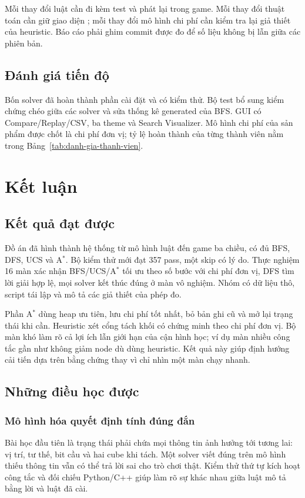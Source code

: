 \documentclass[a4paper]{article}
\newcommand{\tep}[1]{{\small\ttfamily\detokenize{#1}}}
\newcommand{\astar}{\texorpdfstring{A\ensuremath{^*}}{A*}}
\begin{document}
Mỗi thay đổi luật cần đi kèm test và phát lại trong game. Mỗi thay đổi thuật toán cần giữ giao diện \tep{SearchResult}; mỗi thay đổi mô hình chi phí cần kiểm tra lại giả thiết của heuristic. Báo cáo phải ghim commit được đo để số liệu không bị lẫn giữa các phiên bản.




\subsection{Đánh giá tiến độ}
Bốn solver đã hoàn thành phần cài đặt và có kiểm thử. Bộ test bổ sung kiểm chứng chéo giữa các solver và sửa thống kê generated của BFS. GUI có Compare/Replay/CSV, ba theme và Search Visualizer. Mô hình chi phí của sản phẩm được chốt là chi phí đơn vị; tỷ lệ hoàn thành của từng thành viên nằm trong Bảng~\ref{tab:danh-gia-thanh-vien}.

\section{Kết luận}

\subsection{Kết quả đạt được}
Đồ án đã hình thành hệ thống từ mô hình luật đến game ba chiều, có đủ BFS, DFS, UCS và \astar{}. Bộ kiểm thử mới đạt 357 pass, một skip có lý do. Thực nghiệm 16 màn xác nhận BFS/UCS/\astar{} tối ưu theo số bước với chi phí đơn vị, DFS tìm lời giải hợp lệ, mọi solver kết thúc đúng ở màn vô nghiệm. Nhóm có dữ liệu thô, script tái lập và mô tả các giả thiết của phép đo.

Phần \astar{} dùng heap ưu tiên, lưu chi phí tốt nhất, bỏ bản ghi cũ và mở lại trạng thái khi cần. Heuristic xét cổng tách khối có chứng minh theo chi phí đơn vị. Bộ màn khó làm rõ cả lợi ích lẫn giới hạn của cận hình học; ví dụ màn nhiều công tắc gần như không giảm node dù dùng heuristic. Kết quả này giúp định hướng cải tiến dựa trên bằng chứng thay vì chỉ nhìn một màn chạy nhanh.

\subsection{Những điều học được}
\subsubsection{Mô hình hóa quyết định tính đúng đắn}
Bài học đầu tiên là trạng thái phải chứa mọi thông tin ảnh hưởng tới tương lai: vị trí, tư thế, bit cầu và hai cube khi tách. Một solver viết đúng trên mô hình thiếu thông tin vẫn có thể trả lời sai cho trò chơi thật. Kiểm thử thứ tự kích hoạt công tắc và đối chiếu Python/C++ giúp làm rõ sự khác nhau giữa luật mô tả bằng lời và luật đã cài.
\end{document}
